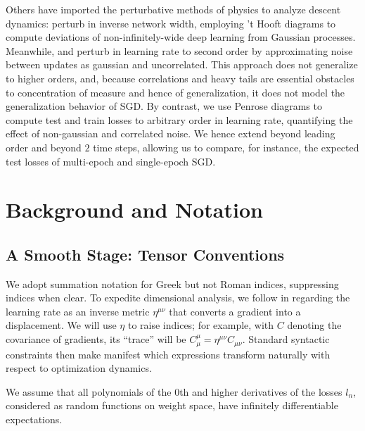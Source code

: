 \documentclass{article}
\begin{document}
    Others have imported the perturbative methods of physics to analyze descent
    dynamics:  \citet{dy19} perturb in inverse network width, employing 't
    Hooft diagrams to compute deviations of non-infinitely-wide deep learning
    from Gaussian processes.  Meanwhile, \cite{ch18} and \citet{li17} perturb
    in learning rate to second order by approximating noise between updates as
    gaussian and uncorrelated.  This approach does not generalize to higher
    orders, and, because correlations and heavy tails are essential obstacles
    to concentration of measure and hence of generalization, it does not model
    the generalization behavior of SGD.  By contrast, we use Penrose diagrams
    to compute test and train losses to arbitrary order in learning rate,
    quantifying the effect of non-gaussian and correlated noise.  We hence
    extend \citet{ro18} beyond leading order and beyond $2$ time steps,
    allowing us to compare, for instance, the expected test losses of
    multi-epoch and single-epoch SGD.


\section{Background and Notation}

\subsection{A Smooth Stage: Tensor Conventions}
    We adopt summation notation for Greek but not Roman indices, suppressing
    indices when clear.  To expedite dimensional analysis, we follow
    \cite{bo13} in regarding the learning rate as an inverse metric
    $\eta^{\mu\nu}$ that converts a gradient into a displacement.  We will use
    $\eta$ to raise indices; for example, with $C$ denoting the covariance of
    gradients, its ``trace'' will be $C^{\mu}_{\mu} = \eta^{\mu\nu}
    C_{\mu\nu}$.  Standard syntactic constraints then make manifest which
    expressions transform naturally with respect to optimization dynamics.
    
    We assume that all polynomials of the $0$th and higher derivatives of the
    losses $l_n$, considered as random functions on weight space, have
    infinitely differentiable expectations.
    
\end{document}
